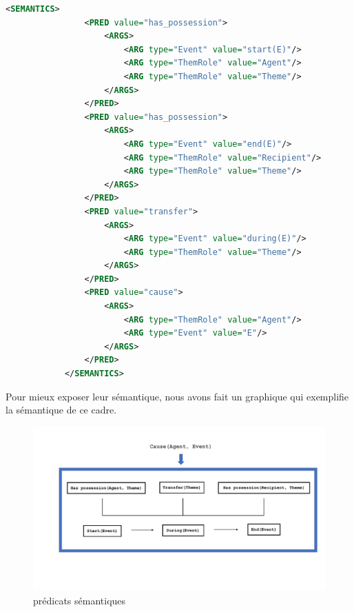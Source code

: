 \begin{lstlisting}[language=Xml, caption=Les prédicats sémantiques]
<SEMANTICS>
                <PRED value="has_possession">
                    <ARGS>
                        <ARG type="Event" value="start(E)"/>
                        <ARG type="ThemRole" value="Agent"/>
                        <ARG type="ThemRole" value="Theme"/>
                    </ARGS>
                </PRED>
                <PRED value="has_possession">
                    <ARGS>
                        <ARG type="Event" value="end(E)"/>
                        <ARG type="ThemRole" value="Recipient"/>
                        <ARG type="ThemRole" value="Theme"/>
                    </ARGS>
                </PRED>
                <PRED value="transfer">
                    <ARGS>
                        <ARG type="Event" value="during(E)"/>
                        <ARG type="ThemRole" value="Theme"/>
                    </ARGS>
                </PRED>
                <PRED value="cause">
                    <ARGS>
                        <ARG type="ThemRole" value="Agent"/>
                        <ARG type="Event" value="E"/>
                    </ARGS>
                </PRED>
            </SEMANTICS>
\end{lstlisting}

Pour mieux exposer leur sémantique, nous avons fait un graphique qui exemplifie la sémantique de ce cadre.

\begin{figure}[h]
	\centering
	\includegraphics[width=1\textwidth, trim = {0cm 2cm 0cm 2cm},clip]{ch4/figs/semantics_give.pdf}
	\caption{prédicats sémantiques}
	\label{fig:Prédicat}
\end{figure}



